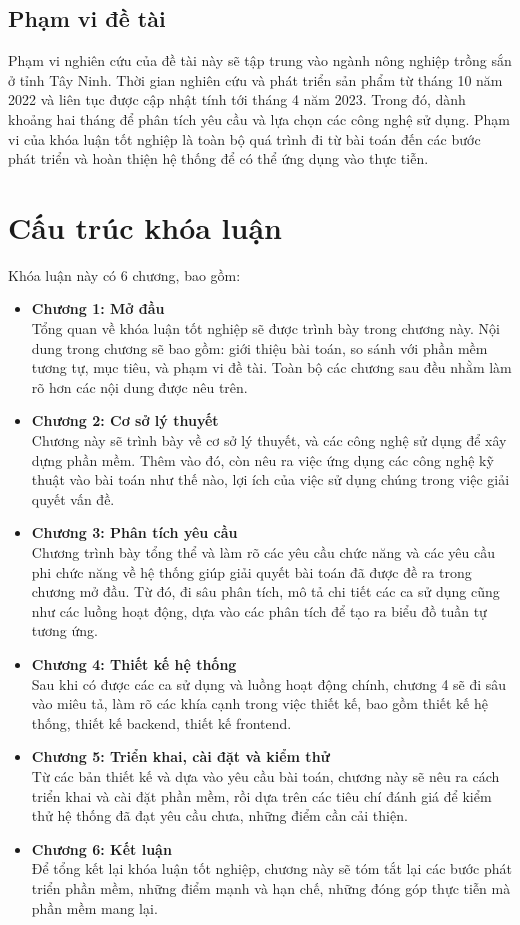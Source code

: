\documentclass[./../main.tex]{subfiles}
\begin{document}
\subsection{Phạm vi đề tài}
Phạm vi nghiên cứu của đề tài này sẽ tập trung vào ngành nông nghiệp trồng sắn ở tỉnh Tây Ninh. Thời gian nghiên cứu và phát triển sản phẩm từ tháng 10 năm 2022 và liên tục được cập nhật tính tới tháng 4 năm 2023. Trong đó, dành khoảng hai tháng để phân tích yêu cầu và lựa chọn các công nghệ sử dụng. Phạm vi của khóa luận tốt nghiệp là toàn bộ quá trình đi từ
bài toán đến các bước phát triển và hoàn thiện hệ thống để có thể ứng dụng vào thực tiễn. 

\section{Cấu trúc khóa luận}
Khóa luận này có 6 chương, bao gồm:
\begin{itemize}
    \item \textbf{Chương 1: Mở đầu}\\ Tổng quan về khóa luận tốt nghiệp sẽ được trình bày trong chương này. Nội dung trong chương sẽ bao gồm: giới thiệu bài toán, so sánh với phần mềm tương tự, mục tiêu, và phạm vi đề tài. Toàn bộ các chương sau đều nhằm làm rõ hơn các nội dung được nêu trên.
    \item \textbf{Chương 2: Cơ sở lý thuyết}\\ Chương này sẽ trình bày về cơ sở lý thuyết, và các công nghệ sử dụng để xây dựng phần mềm. Thêm vào đó, còn nêu ra việc ứng dụng các công nghệ kỹ thuật vào bài toán như thế nào, lợi ích của việc sử dụng chúng trong việc giải quyết vấn đề.
    \item \textbf{Chương 3: Phân tích yêu cầu}\\ Chương trình bày tổng thể và làm rõ các yêu cầu chức năng và các yêu cầu phi chức năng về hệ thống giúp giải quyết bài toán đã được đề ra trong chương mở đầu. Từ đó, đi sâu phân tích, mô tả chi tiết các ca sử dụng cũng như các luồng hoạt động, dựa vào các phân tích để tạo ra biểu đồ tuần tự tương ứng.
    \item \textbf{Chương 4: Thiết kế hệ thống}\\ Sau khi có được các ca sử dụng và luồng hoạt động chính, chương 4 sẽ đi sâu vào miêu tả, làm rõ các khía cạnh trong việc thiết kế, bao gồm thiết kế hệ thống, thiết kế backend, thiết kế frontend.
    \item \textbf{Chương 5: Triển khai, cài đặt và kiểm thử}\\ Từ các bản thiết kế và dựa vào yêu cầu bài toán, chương này sẽ nêu ra cách triển khai và cài đặt phần mềm, rồi dựa trên các tiêu chí đánh giá để kiểm thử hệ thống đã đạt yêu cầu chưa, những điểm cần cải thiện.
    \item \textbf{Chương 6: Kết luận}\\ Để tổng kết lại khóa luận tốt nghiệp, chương này sẽ tóm tắt lại các bước phát triển phần mềm, những điểm mạnh và hạn chế, những đóng góp thực tiễn mà phần mềm mang lại.
\end{itemize}
\end{document}
